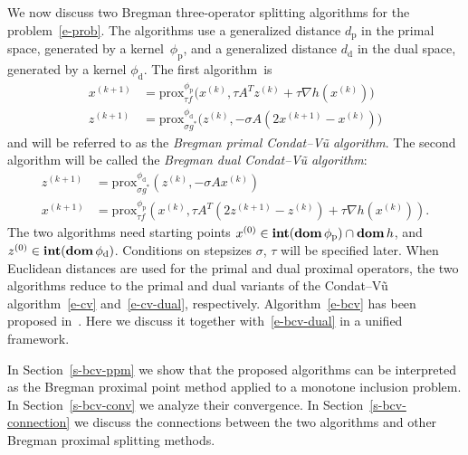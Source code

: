 \documentclass[letterpaper,11pt]{article}
\newcommand{\prox}{\mathrm{prox}}
\newcommand{\dom}{\mathop{\bf dom}}
\newcommand{\intr}{\mathop{\bf int}}
\newcommand{\primal}{\mathrm p}
\newcommand{\dual}{\mathrm d}
\begin{document}
We now discuss two Bregman three-operator splitting algorithms
for the problem~\eqref{e-prob}.
The algorithms use a generalized distance $d_\primal$
in the primal space, generated by a kernel~$\phi_\primal$,
and a generalized distance $d_\dual$ in the dual space,
generated by a kernel $\phi_\dual$.
The first algorithm~is
\begin{subequations} \label{e-bcv}
\begin{align}
  x^{(k+1)} &= \prox^{\phi_\primal}_{\tau f}
    \big(x^{(k)}, \tau A^Tz^{(k)}+\tau \nabla h(x^{(k)}) \big) 
 \label{e-bcv-a}\\
  z^{(k+1)} &= \prox^{\phi_\dual}_{\sigma g^\ast}
    \big(z^{(k)}, -\sigma A(2x^{(k+1)}-x^{(k)})\big)
 \label{e-bcv-b}
\end{align}
\end{subequations}
and will be referred to as 
the \emph{Bregman primal Condat--V\~u algorithm}.
The second algorithm will be called
the \emph{Bregman dual Condat--V\~u algorithm}:
\begin{subequations} \label{e-bcv-dual}
\begin{align}
  z^{(k+1)} &= \prox_{\sigma g^\ast}^{\phi_\dual}
    (z^{(k)}, -\sigma Ax^{(k)}) 
 \label{e-bcv-dual-a}\\
  x^{(k+1)} &= \prox_{\tau f}^{\phi_\primal}
    (x^{(k)}, \tau A^T(2z^{(k+1)}-z^{(k)}) + \tau\nabla h(x^{(k)}) ).
 \label{e-bcv-dual-b}
\end{align}
\end{subequations}
The two algorithms need starting points
$x^{(0)} \in \intr(\dom\phi_\primal) \cap \dom h$,
and $z^{(0)} \in \intr(\dom\phi_\dual)$.
Conditions on stepsizes $\sigma$, $\tau$ will be specified later.
When Euclidean distances are used for the primal and dual proximal
operators, the two algorithms reduce to the primal and dual variants
of the Condat--V\~u algorithm~\eqref{e-cv} and~\eqref{e-cv-dual},
respectively.
Algorithm~\eqref{e-bcv} has been proposed in~\cite{ChP:16}.  Here
we discuss it together with~\eqref{e-bcv-dual} in a unified framework.

In Section~\ref{s-bcv-ppm} we show that the proposed algorithms
can be interpreted as the Bregman proximal point method
applied to a monotone inclusion problem.
In Section~\ref{s-bcv-conv} we analyze their convergence.
In Section~\ref{s-bcv-connection} we discuss the connections between the 
two algorithms and other Bregman proximal splitting methods.
\end{document}
